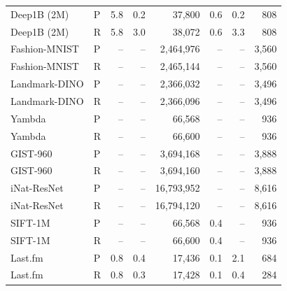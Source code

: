 \begin{tabular}{llrrrrrr}
Deep1B (2M) & P & 5.8 & 0.2 & 37,800 & 0.6 & 0.2 & 808 \\
Deep1B (2M) & R & 5.8 & 3.0 & 38,072 & 0.6 & 3.3 & 808 \\
Fashion-MNIST & P & -- & -- & 2,464,976 & -- & -- & 3,560 \\
Fashion-MNIST & R & -- & -- & 2,465,144 & -- & -- & 3,560 \\
Landmark-DINO & P & -- & -- & 2,366,032 & -- & -- & 3,496 \\
Landmark-DINO & R & -- & -- & 2,366,096 & -- & -- & 3,496 \\
Yambda & P & -- & -- & 66,568 & -- & -- & 936 \\
Yambda & R & -- & -- & 66,600 & -- & -- & 936 \\
GIST-960 & P & -- & -- & 3,694,168 & -- & -- & 3,888 \\
GIST-960 & R & -- & -- & 3,694,160 & -- & -- & 3,888 \\
iNat-ResNet & P & -- & -- & 16,793,952 & -- & -- & 8,616 \\
iNat-ResNet & R & -- & -- & 16,794,120 & -- & -- & 8,616 \\
SIFT-1M & P & -- & -- & 66,568 & 0.4 & -- & 936 \\
SIFT-1M & R & -- & -- & 66,600 & 0.4 & -- & 936 \\
Last.fm & P & 0.8 & 0.4 & 17,436 & 0.1 & 2.1 & 684 \\
Last.fm & R & 0.8 & 0.3 & 17,428 & 0.1 & 0.4 & 284 \\
\bottomrule
\end{tabular}
